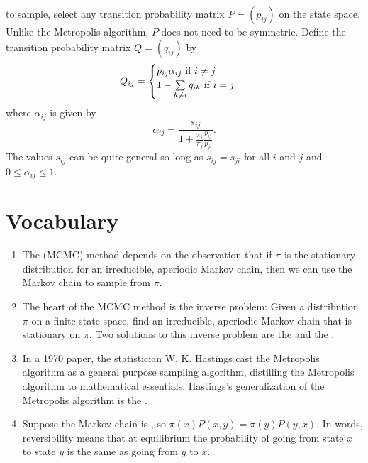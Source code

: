 \documentclass[12pt]{article}
\begin{document}
\begin{enumerate}
        \pi \) to sample, select any transition probability matrix \( P
        = (p_{ij}) \) on the state space.  Unlike the Metropolis
        algorithm, \( P \) does not need to be symmetric.  Define the
        transition probability matrix \( Q= (q_{ij}) \) by
        \[
            Q_{ij} =
            \begin{cases}
                p_{ij} \alpha_{ij} \text{ if \( i \ne j \) } \\
                1 - \sum\limits_ {k \ne i} q_{ik} \text{ if \( i = j \)
                }
            \end{cases}
        \] where \( \alpha_{ij} \) is given by
        \[
            \alpha_{ij} = \frac{s_{ij}}{1 + \frac{\pi_i}{\pi_j} \frac{p_
            {ij}}{p_{ji}}}.
        \] The values \( s_{ij} \) can be quite general so long as \( s_
        {ij} = s_{ji} \) for all \( i \) and \( j \) and \( 0 \le \alpha_
        {ij} \le 1 \).
\end{enumerate}

\hr

\section*{Vocabulary}
\begin{enumerate}
    \item
        The  (MCMC) method depends on the
        observation that if \( \pi \) is the stationary distribution for
        an irreducible, aperiodic Markov chain, then we can use the
        Markov chain to sample from \( \pi \).
    \item
        The heart of the MCMC method is the inverse problem:  Given a
        distribution \( \pi \) on a finite state space, find an
        irreducible, aperiodic Markov chain that is stationary on \( \pi
        \).  Two solutions to this inverse problem are the  and the .
    \item
        In a 1970 paper, the statistician W. K. Hastings cast the
        Metropolis algorithm as a general purpose sampling algorithm,
        distilling the Metropolis algorithm to mathematical essentials.
        Hastings's generalization of the Metropolis algorithm is the
        .
    \item
        Suppose the Markov chain is , so \( \pi(x) P(x,y)
        = \pi(y) P(y,x) \).  In words, reversibility means that at
        equilibrium the probability of going from state \( x \) to state
        \( y \) is the same as going from \( y \) to \( x \).
\end{enumerate}
\end{document}
